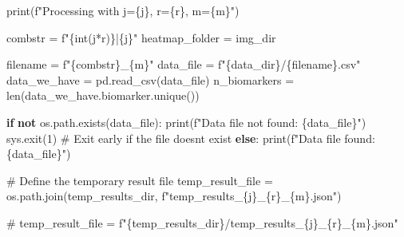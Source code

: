 \documentclass[
  letterpaper,
  DIV=11,
  numbers=noendperiod]{scrreprt}
\newenvironment{Shaded}{\begin{snugshade}}{\end{snugshade}}
\newcommand{\BuiltInTok}[1]{\textcolor[rgb]{0.00,0.23,0.31}{#1}}
\newcommand{\CommentTok}[1]{\textcolor[rgb]{0.37,0.37,0.37}{#1}}
\newcommand{\ControlFlowTok}[1]{\textcolor[rgb]{0.00,0.23,0.31}{\textbf{#1}}}
\newcommand{\DecValTok}[1]{\textcolor[rgb]{0.68,0.00,0.00}{#1}}
\newcommand{\KeywordTok}[1]{\textcolor[rgb]{0.00,0.23,0.31}{\textbf{#1}}}
\newcommand{\NormalTok}[1]{\textcolor[rgb]{0.00,0.23,0.31}{#1}}
\newcommand{\OperatorTok}[1]{\textcolor[rgb]{0.37,0.37,0.37}{#1}}
\newcommand{\SpecialCharTok}[1]{\textcolor[rgb]{0.37,0.37,0.37}{#1}}
\newcommand{\SpecialStringTok}[1]{\textcolor[rgb]{0.13,0.47,0.30}{#1}}
\begin{document}
\begin{Shaded}
\begin{Highlighting}[]
    \BuiltInTok{print}\NormalTok{(}\SpecialStringTok{f"Processing with j=}\SpecialCharTok{\{}\NormalTok{j}\SpecialCharTok{\}}\SpecialStringTok{, r=}\SpecialCharTok{\{}\NormalTok{r}\SpecialCharTok{\}}\SpecialStringTok{, m=}\SpecialCharTok{\{}\NormalTok{m}\SpecialCharTok{\}}\SpecialStringTok{"}\NormalTok{)}

\NormalTok{    combstr }\OperatorTok{=} \SpecialStringTok{f"}\SpecialCharTok{\{}\BuiltInTok{int}\NormalTok{(j}\OperatorTok{*}\NormalTok{r)}\SpecialCharTok{\}}\SpecialStringTok{|}\SpecialCharTok{\{}\NormalTok{j}\SpecialCharTok{\}}\SpecialStringTok{"}
\NormalTok{    heatmap\_folder }\OperatorTok{=}\NormalTok{ img\_dir}
    
\NormalTok{    filename }\OperatorTok{=} \SpecialStringTok{f"}\SpecialCharTok{\{}\NormalTok{combstr}\SpecialCharTok{\}}\SpecialStringTok{\_}\SpecialCharTok{\{}\NormalTok{m}\SpecialCharTok{\}}\SpecialStringTok{"}
\NormalTok{    data\_file }\OperatorTok{=} \SpecialStringTok{f"}\SpecialCharTok{\{}\NormalTok{data\_dir}\SpecialCharTok{\}}\SpecialStringTok{/}\SpecialCharTok{\{}\NormalTok{filename}\SpecialCharTok{\}}\SpecialStringTok{.csv"}
\NormalTok{    data\_we\_have }\OperatorTok{=}\NormalTok{ pd.read\_csv(data\_file)}
\NormalTok{    n\_biomarkers }\OperatorTok{=} \BuiltInTok{len}\NormalTok{(data\_we\_have.biomarker.unique())}

    \ControlFlowTok{if} \KeywordTok{not}\NormalTok{ os.path.exists(data\_file):}
        \BuiltInTok{print}\NormalTok{(}\SpecialStringTok{f"Data file not found: }\SpecialCharTok{\{}\NormalTok{data\_file}\SpecialCharTok{\}}\SpecialStringTok{"}\NormalTok{)}
\NormalTok{        sys.exit(}\DecValTok{1}\NormalTok{)  }\CommentTok{\# Exit early if the file doesn\textquotesingle{}t exist}
    \ControlFlowTok{else}\NormalTok{:}
        \BuiltInTok{print}\NormalTok{(}\SpecialStringTok{f"Data file found: }\SpecialCharTok{\{}\NormalTok{data\_file}\SpecialCharTok{\}}\SpecialStringTok{"}\NormalTok{)}

    \CommentTok{\# Define the temporary result file}
\NormalTok{    temp\_result\_file }\OperatorTok{=}\NormalTok{ os.path.join(temp\_results\_dir, }\SpecialStringTok{f"temp\_results\_}\SpecialCharTok{\{}\NormalTok{j}\SpecialCharTok{\}}\SpecialStringTok{\_}\SpecialCharTok{\{}\NormalTok{r}\SpecialCharTok{\}}\SpecialStringTok{\_}\SpecialCharTok{\{}\NormalTok{m}\SpecialCharTok{\}}\SpecialStringTok{.json"}\NormalTok{)}

    \CommentTok{\# temp\_result\_file = f"\{temp\_results\_dir\}/temp\_results\_\{j\}\_\{r\}\_\{m\}.json"}
    

\end{Highlighting}
\end{Shaded}
\end{document}
